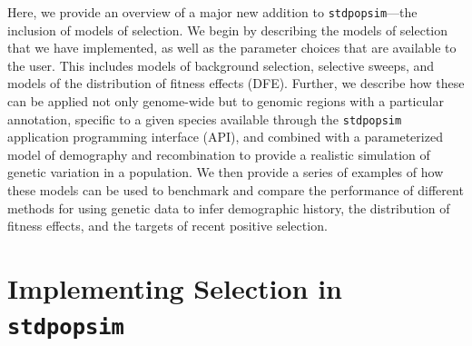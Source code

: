 \documentclass[hidelinks]{article}
\newcommand{\stdpopsim}{\texttt{stdpopsim}\xspace}
\begin{document}
    Here, we provide an overview of a major new addition
    to \stdpopsim---the inclusion of models of selection.
    We begin by describing the models of selection that we have implemented,
    as well as the parameter choices that are available to the user.
    This includes models of background selection, selective sweeps, and
    models of the distribution of fitness effects (DFE).
    Further, we describe how these can be applied not only genome-wide but to
    genomic regions with a particular annotation, specific to a given species available
    through the \stdpopsim application programming interface (API), and combined with a parameterized model of
    demography and recombination to provide a realistic simulation of
    genetic variation in a population.
    We then provide a series of examples of how these models can be used
    to benchmark and compare the performance of different methods for
    using genetic data to infer demographic history, the distribution of fitness effects,
    and the targets of recent positive selection.

\section*{Implementing Selection in \stdpopsim}
    \label{selection}
\end{document}
